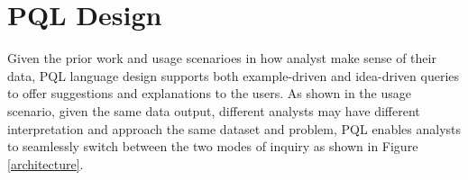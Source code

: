 \documentclass{sig-alternate-05-2015}
\begin{document}
\section{PQL Design}
Given the prior work and usage scenarioes in how analyst make sense of their data, PQL language design supports both example-driven and idea-driven queries to offer suggestions and explanations to the users. As shown in the usage scenario, given the same data output, different analysts may have different interpretation and approach the same dataset and problem, PQL enables analysts to seamlessly switch between the two modes of inquiry as shown in Figure \ref{architecture}. %


  
\end{document}

